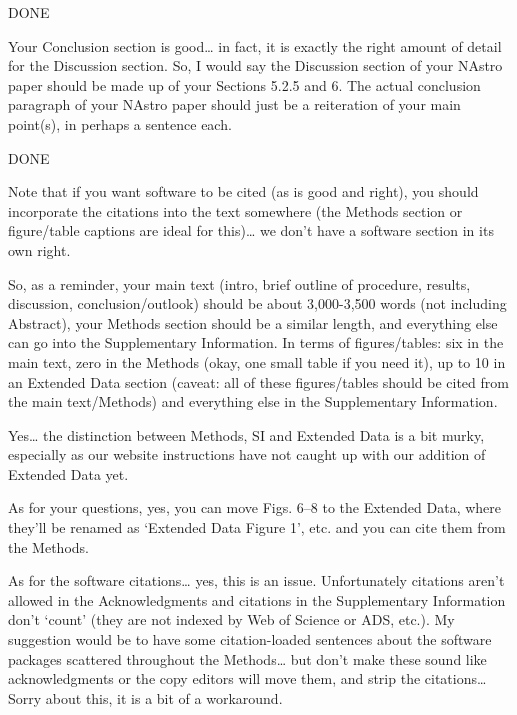 DONE
 

Your Conclusion section is good… in fact, it is exactly the right amount of detail for the Discussion section. So, I would say the Discussion section of your NAstro paper should be made up of your Sections 5.2.5 and 6. The actual conclusion paragraph of your NAstro paper should just be a reiteration of your main point(s), in perhaps a sentence each.

 DONE

Note that if you want software to be cited (as is good and right), you should incorporate the citations into the text somewhere (the Methods section or figure/table captions are ideal for this)… we don’t have a software section in its own right.

So, as a reminder, your main text (intro, brief outline of procedure, results, discussion, conclusion/outlook) should be about 3,000-3,500 words (not including Abstract), your Methods section should be a similar length, and everything else can go into the Supplementary Information. In terms of figures/tables: six in the main text, zero in the Methods (okay, one small table if you need it), up to 10 in an Extended Data section (caveat: all of these figures/tables should be cited from the main text/Methods) and everything else in the Supplementary Information.

 

Yes… the distinction between Methods, SI and Extended Data is a bit murky, especially as our website instructions have not caught up with our addition of Extended Data yet.



As for your questions, yes, you can move Figs. 6–8 to the Extended Data, where they’ll be renamed as ‘Extended Data Figure 1’, etc. and you can cite them from the Methods.



As for the software citations… yes, this is an issue. Unfortunately citations aren’t allowed in the Acknowledgments and citations in the Supplementary Information don’t ‘count’ (they are not indexed by Web of Science or ADS, etc.). My suggestion would be to have some citation-loaded sentences about the software packages scattered throughout the Methods… but don’t make these sound like acknowledgments or the copy editors will move them, and strip the citations… Sorry about this, it is a bit of a workaround.

